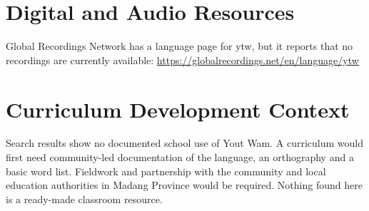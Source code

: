\documentclass[12pt]{article}
\begin{document}
\section{Digital and Audio Resources}
Global Recordings Network has a language page for ytw, but it reports that no recordings are currently available: \url{https://globalrecordings.net/en/language/ytw}

\section{Curriculum Development Context}
Search results show no documented school use of Yout Wam. A curriculum would first need community-led documentation of the language, an orthography and a basic word list. Fieldwork and partnership with the community and local education authorities in Madang Province would be required. Nothing found here is a ready-made classroom resource.
\end{document}
